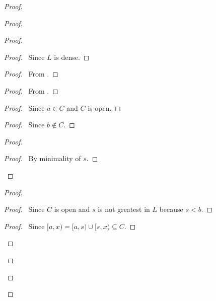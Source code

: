\begin{proof}
\begin{proof}
\begin{proof}
            \begin{proof}
                \pf\ Since $L$ is dense.
            \end{proof}
            \begin{proof}
                \pf\ From .
            \end{proof}
            \begin{proof}
                \pf\ From .
            \end{proof}
            \qedstep    {}
            \step{5}{\pflet{$S = \{ x \in L \mid a < x \text{ and } [a,x) \subseteq C \}$}}
            \begin{proof}
                \pf\ Since $a \in C$ and $C$ is open.
            \end{proof}
            \begin{proof}
                \pf\ Since $b \notin C$.
            \end{proof}
            \begin{proof}
                \step{i}{\pflet{$y \in [a,s)$} \prove{$y \in C$}}
                \begin{proof}
                    \pf\ By minimality of $s$.
                \end{proof}
                \step{iii}{$y \in [a,z) \subseteq C$}
            \end{proof}
            \begin{proof}
                \step{a}{\pick\ $x$ such that $s < x$ and $[s,x) \subseteq C$}
                \begin{proof}
                    \pf\ Since $C$ is open and $s$ is not greatest in $L$ because $s < b$.
                \end{proof}
                \begin{proof}
                    \pf\ Since $[a,x) = [a,s) \cup [s,x) \subseteq C$.
                \end{proof}

\end{proof}
\end{proof}
\end{proof}
\end{proof}
